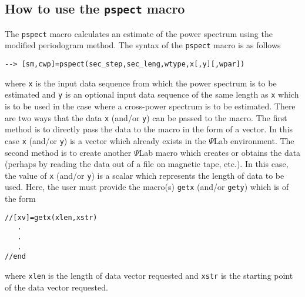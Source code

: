\subsection{How to use the {\tt pspect} macro}

	The {\tt pspect} macro calculates an estimate of
the power spectrum using the modified periodogram method.  The
syntax of the {\tt pspect} macro is as follows
\begin{verbatim}
--> [sm,cwp]=pspect(sec_step,sec_leng,wtype,x[,y][,wpar])
\end{verbatim}
where {\tt x} is the input data sequence from which the power spectrum
is to be estimated and {\tt y} is an optional input data sequence of the
same length as {\tt x} which is to be used in the case where a cross-power
spectrum is to be estimated.  There are two ways that the data {\tt x}
(and/or {\tt y}) can be passed to the macro.  The first method is to directly
pass the data to the macro in the form of a vector. In this case {\tt x}
(and/or {\tt y}) is a vector which already exists in the $\Psi$Lab environment.
The second method is to create another $\Psi$Lab macro which creates or obtains
the data (perhaps by reading the data out of a file on magnetic tape, etc.).
In this case, the value of {\tt x} (and/or {\tt y}) 
is a scalar which represents
the length of data to be used.  Here, the user must provide the macro(s)
{\tt getx} (and/or {\tt gety}) which is of the form
\begin{verbatim}
//[xv]=getx(xlen,xstr)
   .
   .
   .
//end
\end{verbatim}
where {\tt xlen} is the length of data vector requested and {\tt xstr} is the
starting point of the data vector requested.


